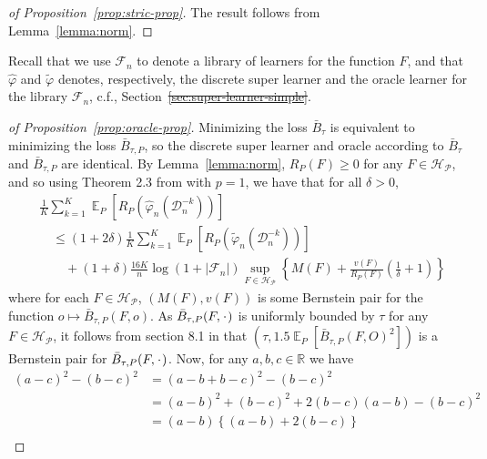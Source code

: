 \documentclass[lineno]{biometrika}
\DeclareMathOperator{\E}{\mathbb{E}} %
\newcommand{\R}{\mathbb{R}}
\newcommand{\blank}{\makebox[1ex]{\textbf{$\cdot$}}}
\renewcommand{\phi}{\varphi}
\newcommand{\1}{\mathds{1}}
\newcommand{\data}{\ensuremath{\mathcal{D}}}
\providecommand{\DIFadd}[1]{{\protect\color{blue}\uwave{#1}}} %
\providecommand{\DIFdel}[1]{{\protect\color{red}\sout{#1}}}                      %
\providecommand{\DIFaddbegin}{} %
\providecommand{\DIFaddend}{} %
\providecommand{\DIFdelbegin}{} %
\providecommand{\DIFdelend}{} %
\begin{document}
\begin{proof}[of Proposition~\ref{prop:stric-prop}]
  The result follows from Lemma~\ref{lemma:norm}.
\end{proof}

Recall that we use \( \mathcal{F}_n \) to denote a library of learners for the
function \( F \), and that \( \hat{\phi} \) and \( \tilde{\phi} \) denotes,
respectively, the discrete super learner and the oracle learner for the library
\( \mathcal{F}_n \), c.f., Section~\DIFdelbegin \DIFdel{\ref{sec:super-learner-simple}}\DIFdelend \DIFaddbegin \DIFadd{\ref{sec:joint-survival-super-learner}}\DIFaddend .

\begin{proof}[of Proposition~\ref{prop:oracle-prop}]
  Minimizing the loss \( \bar{B}_{\tau} \) is equivalent to
  minimizing the loss \( \bar{B}_{\tau,P} \), so the discrete super learner and
  oracle according to \( \bar{B}_{\tau} \) and \( \bar{B}_{\tau,P} \) are
  identical. By Lemma~\ref{lemma:norm}, \( R_P(F) \geq 0 \) for any
  \( F \in \mathcal{H}_{\mathcal{P}} \), and so using Theorem 2.3 from
  \citep{vaart2006oracle} with \( p=1 \), we have that for all \( \delta >0 \),
\begin{align*}
  & \frac{1}{K} \sum_{k=1}^{K} \E_{P}{\left[ R_P(\hat{\phi}_n(\data_n^{-k})) \right]}
  \\
  &  \quad \leq
    (1+2\delta)\frac{1}{K} \sum_{k=1}^{K}\E_{P}{\left[ R_P(\tilde{\phi}_n(\data_n^{-k})) \right]}
  \\
  & \qquad + (1+\delta) \frac{16 K}{n}
    \log(1 + |\mathcal{F}_n|)\sup_{F \in \mathcal{H}_{\mathcal{P}}}
    \left\{
    M(F) + \frac{v(F)}{R_P(F)}
    \left(
    \frac{1}{\delta} + 1
    \right)
    \right\}
\end{align*}
where for each \( F \in \mathcal{H}_{\mathcal{P}} \),
\( (M(F), v(F)) \) is some Bernstein pair for the function
\(o \mapsto \bar{B}_{\tau,P}(F, o) \). As
\( \bar{B}_{\tau,P}(F, \blank) \) is uniformly bounded by \( \tau \)
for any \( F \in \mathcal{H}_{\mathcal{P}} \), it follows from section
8.1 in \citep{vaart2006oracle} that
\( (\tau, 1.5 \E_P{[\bar{B}_{\tau,P}(F, O)^2]}) \) is a Bernstein
pair for \( \bar{B}_{\tau,P}(F, \blank) \). Now, for any
\( a,b,c \in \R \) we have
\begin{align*}
  (a-c)^2 - (b-c)^2
  & = (a-b+b-c)^2 - (b-c)^2
  \\
  & = (a-b)^2 + (b-c)^2 +2(b-c)(a-b) - (b-c)^2
  \\
  & = (a-b)
    \left\{
    (a-b) +  2(b-c)
    \right\}
  \\

\end{align*}
\end{proof}
\end{document}
